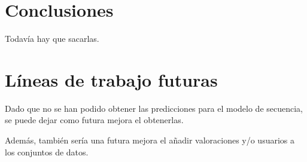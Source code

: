 
\section{Conclusiones}\label{conclusiones}
Todavía hay que sacarlas.

\section{Líneas de trabajo futuras}\label{lineas-futuras}
Dado que no se han podido obtener las predicciones para el modelo de secuencia, se puede dejar como futura mejora el obtenerlas.

Además, también sería una futura mejora el añadir valoraciones y/o usuarios a los conjuntos de datos.